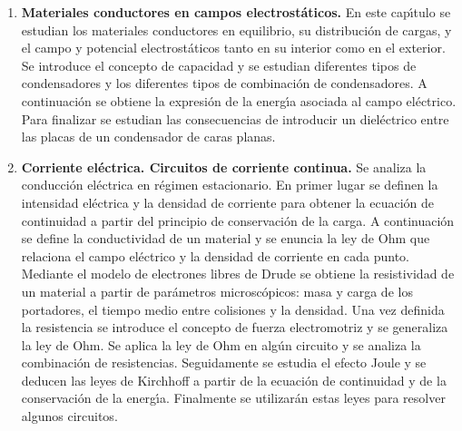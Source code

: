 \begin{enumerate} [{\bf 1. }]
\item {\bf Materiales conductores en campos electrost\'{a}ticos.}
En este cap\'{\i}tulo se estudian los materiales conductores en equilibrio,
 su distribuci\'{o}n de cargas, y el campo y potencial electrost\'{a}ticos tanto 
en su interior como en el exterior. Se introduce el concepto de capacidad y se
 estudian diferentes tipos de condensadores y los diferentes tipos de 
combinaci\'{o}n de condensadores. A continuaci\'{o}n se obtiene la expresi\'{o}n 
de la energ\'{\i}a asociada al campo el\'{e}ctrico.
Para finalizar 
se estudian las consecuencias de introducir un diel\'{e}ctrico entre las placas de un
 condensador de caras planas. 


\item {\bf Corriente el\'{e}ctrica. Circuitos de corriente continua.}
Se analiza la conducci\'{o}n el\'{e}ctrica en r\'{e}gimen estacionario. 
En primer lugar se definen la intensidad el\'{e}ctrica y la densidad de
 corriente para obtener la ecuaci\'{o}n de continuidad a partir del principio
 de conservaci\'{o}n de la carga. A continuaci\'{o}n se define la conductividad
 de un material y se enuncia la ley de Ohm que relaciona el campo el\'{e}ctrico
 y la densidad de corriente en cada punto. Mediante el modelo de electrones
 libres de Drude se obtiene la resistividad de un material a partir de
 par\'{a}metros microsc\'{o}picos: masa y carga de los portadores, el tiempo
 medio entre colisiones y la densidad. Una vez definida la resistencia se introduce
 el concepto de fuerza electromotriz y se generaliza la ley de Ohm. Se aplica la
 ley de Ohm en alg\'{u}n circuito y se analiza la combinaci\'{o}n de resistencias.
 Seguidamente se estudia el efecto Joule y se deducen las leyes de Kirchhoff
 a partir de la ecuaci\'{o}n de continuidad y de la conservaci\'{o}n de la 
energ\'{\i}a. Finalmente se utilizar\'{a}n estas leyes para resolver algunos 
circuitos.





\end{enumerate}
